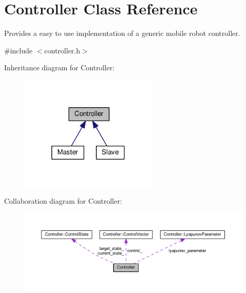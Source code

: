 \hypertarget{classController}{}\section{Controller Class Reference}
\label{classController}


Provides a easy to use implementation of a generic mobile robot controller.  




{\ttfamily \#include $<$controller.\+h$>$}



Inheritance diagram for Controller\+:\nopagebreak
\begin{figure}[H]
\begin{center}
\leavevmode
\includegraphics[width=186pt]{classController__inherit__graph}
\end{center}
\end{figure}


Collaboration diagram for Controller\+:\nopagebreak
\begin{figure}[H]
\begin{center}
\leavevmode
\includegraphics[width=350pt]{classController__coll__graph}
\end{center}
\end{figure}
